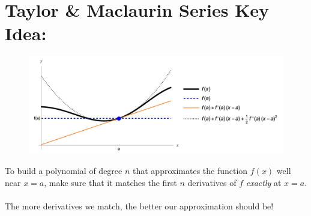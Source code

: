 \title{\mySubTitle}\date{}
\maketitle


\hspace*{-.8in}%

\setlength{\columnseprule}{.4pt}
\setlength{\columnsep}{3em}

\section*{Taylor \& Maclaurin Series Key Idea:}

\begin{figure}[!h]
\includegraphics[width=1.05\textwidth]{Ch8s7-Taylor2.png}
\end{figure}
To build a polynomial of degree \(n\) that approximates the function \(f(x)\) well near \(x=a\), make sure that it matches the first \(n\) derivatives of \(f\) \textit{exactly} at \(x=a\).\\~\\
 The more derivatives we match, the better our approximation should be!\\~\\

